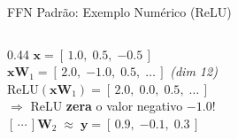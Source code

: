 \documentclass[aspectratio=169, xcolor=dvipsnames]{beamer}
\begin{document}
\begin{frame}{FFN Padrão: Exemplo Numérico (ReLU)}
\begin{columns}[T]
\begin{column}{0.44\textwidth}
        {\setlength{\fboxsep}{3pt}%
        \colorbox{CellBlue}{$\mathbf{x} = [\,1.0,\;0.5,\;{-0.5}\,]$}\\[0.35em]
        \colorbox{CellYellow}{$\mathbf{x}\mathbf{W}_1 = [\,2.0,\;{-1.0},\;0.5,\;\ldots\,]$\scriptsize\textit{ (dim 12)}}\\[0.35em]
        \colorbox{CellRed}{$\mathrm{ReLU}(\mathbf{x}\mathbf{W}_1) = [\,2.0,\;\mathbf{0.0},\;0.5,\;\ldots\,]$}\\[0.3em]
        }%
        \textcolor{red!70!black}{\tiny$\Rightarrow$ ReLU \textbf{zera} o valor negativo $-1.0$!}\\[0.5em]

        {\setlength{\fboxsep}{3pt}%
        \colorbox{CellYellow}{$[\,\cdots\,]\mathbf{W}_2\;\approx\;\mathbf{y} = [\,0.9,\;{-0.1},\;0.3\,]$}
        }
      \end{column}
    \end{columns}
  \end{frame}
\end{document}
